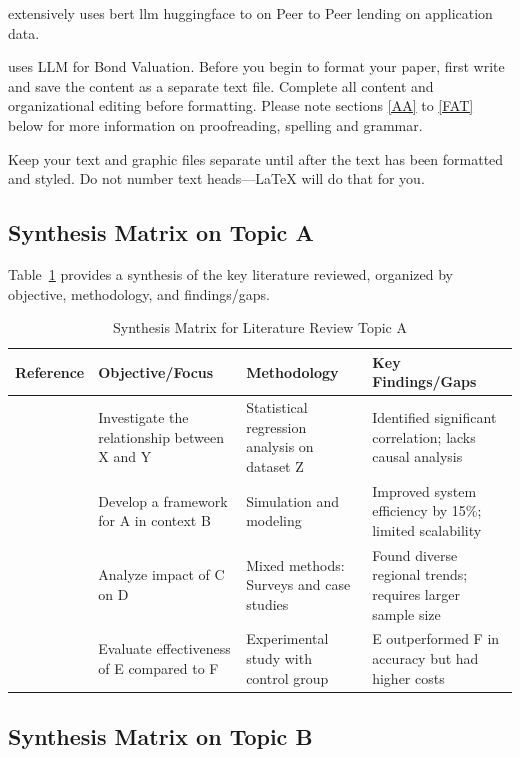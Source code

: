 \documentclass[conference]{IEEEtran}
\begin{document}
\textcite{sanz-guerreroCreditRiskMeets2024} extensively uses bert llm huggingface to on Peer to Peer lending on application data. 

\textcite{khojaAIBondValues2024} uses LLM for Bond Valuation. 
Before you begin to format your paper, first write and save the content as a 
separate text file. Complete all content and organizational editing before 
formatting. Please note sections \ref{AA} to \ref{FAT} below for more information on 
proofreading, spelling and grammar.

Keep your text and graphic files separate until after the text has been 
formatted and styled. Do not number text heads---{\LaTeX} will do that 
for you.

\subsection{Synthesis Matrix on Topic A}

Table~\ref{tab:synthesis_matrix} provides a synthesis of the key literature reviewed, organized by objective, methodology, and findings/gaps.

\begin{table}[htbp]
	\caption{Synthesis Matrix for Literature Review Topic A}
	\label{tab:synthesis_matrix}
	\centering
	\renewcommand{\arraystretch}{1.2} %
	\begin{tabularx}{\linewidth}{|X|X|X|X|}
		\hline
		\textbf{Reference} & \textbf{Objective/Focus} & \textbf{Methodology} & \textbf{Key Findings/Gaps} \\ \hline
		\cite{ref1} & Investigate the relationship between X and Y & Statistical regression analysis on dataset Z & Identified significant correlation; lacks causal analysis \\ \hline
		\cite{ref2} & Develop a framework for A in context B & Simulation and modeling & Improved system efficiency by 15\%; limited scalability \\ \hline
		\cite{ref3} & Analyze impact of C on D & Mixed methods: Surveys and case studies & Found diverse regional trends; requires larger sample size \\ \hline
		\cite{ref4} & Evaluate effectiveness of E compared to F & Experimental study with control group & E outperformed F in accuracy but had higher costs \\ \hline
	\end{tabularx}
\end{table}


\subsection{Synthesis Matrix on Topic B}
\end{document}
